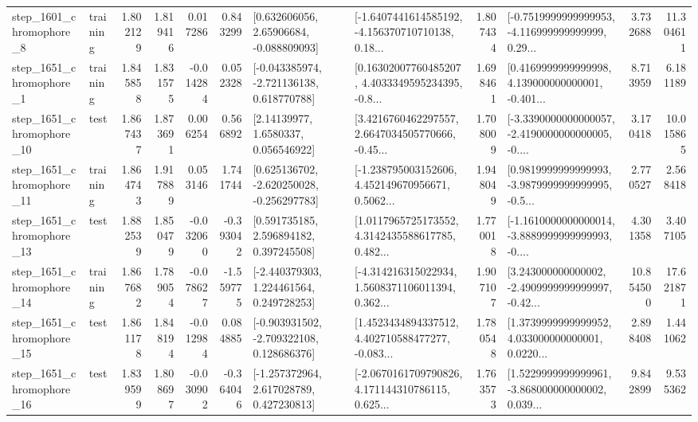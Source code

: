 \begin{tabular}{llrrrrllrlrr}
  step\_1601\_chromophore\_8 &  training &      1.802129 &    1.819416 &      0.017286 &  0.843299 &     [0.632606056, 2.65906684, -0.088809093] &  [-1.6407441614585192, -4.156370710710138, 0.18... &       1.807434 &  [-0.7519999999999953, -4.116999999999999, 0.29... &            3.732688 &         11.304611 \\
  step\_1651\_chromophore\_1 &  training &      1.845858 &    1.831575 &     -0.014284 &  0.052328 &   [-0.043385974, -2.721136138, 0.618770788] &  [0.16302007760485207, 4.4033349595234395, -0.8... &       1.698461 &  [0.4169999999999998, 4.139000000000001, -0.401... &            8.713959 &          6.181189 \\
 step\_1651\_chromophore\_10 &      test &      1.867437 &    1.873691 &      0.006254 &  0.566892 &        [2.14139977, 1.6580337, 0.056546922] &  [3.4216760462297557, 2.6647034505770666, -0.45... &       1.708009 &  [-3.3390000000000057, -2.4190000000000005, -0.... &            3.170418 &         10.015865 \\
 step\_1651\_chromophore\_11 &  training &      1.864743 &    1.917889 &      0.053146 &  1.741744 &   [0.625136702, -2.620250028, -0.256297783] &  [-1.238795003152606, 4.452149670956671, 0.5062... &       1.948049 &  [0.9819999999999993, -3.9879999999999995, -0.5... &            2.770527 &          2.568418 \\
 step\_1651\_chromophore\_13 &      test &      1.882539 &    1.850479 &     -0.032060 & -0.393042 &     [0.591735185, 2.596894182, 0.397245508] &  [1.0117965725173552, 4.3142435588617785, 0.482... &       1.770018 &  [-1.1610000000000014, -3.8889999999999993, -0.... &            4.301358 &          3.407105 \\
 step\_1651\_chromophore\_14 &  training &      1.867682 &    1.789054 &     -0.078627 & -1.559775 &    [-2.440379303, 1.224461564, 0.249728253] &  [-4.314216315022934, 1.5608371106011394, 0.362... &       1.907107 &  [3.243000000000002, -2.4909999999999997, -0.42... &           10.854500 &         17.621871 \\
 step\_1651\_chromophore\_15 &      test &      1.861178 &    1.848194 &     -0.012984 &  0.084885 &   [-0.903931502, -2.709322108, 0.128686376] &  [1.4523434894337512, 4.402710588477277, -0.083... &       1.780548 &  [1.3739999999999952, 4.033000000000001, 0.0220... &            2.898408 &          1.441062 \\
 step\_1651\_chromophore\_16 &      test &      1.839599 &    1.808697 &     -0.030902 & -0.364046 &    [-1.257372964, 2.617028789, 0.427230813] &  [-2.0670161709790826, 4.171144310786115, 0.625... &       1.763573 &  [1.5229999999999961, -3.868000000000002, 0.039... &            9.842899 &          9.535362 \\

\end{tabular}
